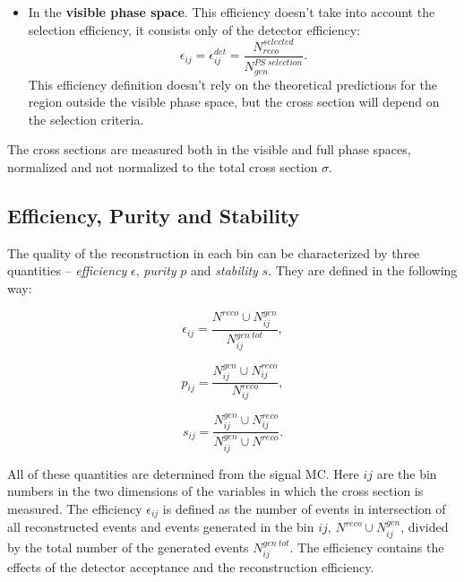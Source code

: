 \begin{itemize}
 \item In the \textbf{visible phase space}. This efficiency doesn't take into account the selection efficiency, it consists only of the detector efficiency:
 \begin{equation}
  \epsilon_{ij} = \epsilon_{ij}^{det} = \frac{N^{selected}_{reco}}{N^{PS\;selection}_{gen}}.
 \end{equation}
 This efficiency definition doesn't rely on the theoretical predictions for the region outside the visible phase space, but the cross section will depend on
 the selection criteria.
\end{itemize}

The cross sections are measured both in the visible and full phase spaces, normalized and not normalized to the total cross section $\sigma$. 

\subsection{Efficiency, Purity and Stability}\label{ssec:EPS}

The quality of the reconstruction in each bin can be characterized by three quantities -- \textit{efficiency} $\epsilon$, \textit{purity} $p$ and
\textit{stability} $s$. They are defined in the following way:

\begin{equation}
 \epsilon_{ij} = \frac{N^{reco} \cup N_{ij}^{gen}}{N_{ij}^{gen\:tot}},
\end{equation}

\begin{equation}
 p_{ij} = \frac{N_{ij}^{gen} \cup N_{ij}^{reco}}{N_{ij}^{reco}},
\end{equation}

\begin{equation}
 s_{ij} = \frac{N_{ij}^{gen} \cup N_{ij}^{reco}}{N_{ij}^{gen} \cup N^{reco}}.
\end{equation}

All of these quantities are determined from the signal MC. Here $ij$ are the bin numbers in the two dimensions of the variables in which
the cross section is measured. The efficiency 
$\epsilon_{ij}$ is defined as the number of events in intersection of all reconstructed events and events generated in the bin $ij$, 
$N^{reco} \cup N_{ij}^{gen}$, divided by the total number of the generated events $N_{ij}^{gen\:tot}$. 
The efficiency contains the effects of the detector acceptance and the reconstruction efficiency.

